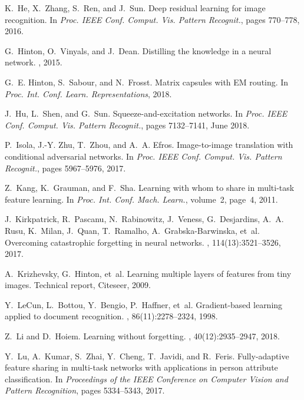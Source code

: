 \documentclass[10pt,twocolumn,letterpaper]{article}
\begin{document}
{\begin{thebibliography}{10}
K.~He, X.~Zhang, S.~Ren, and J.~Sun.
\newblock Deep residual learning for image recognition.
\newblock In {\em Proc. IEEE Conf. Comput. Vis. Pattern Recognit.}, pages
  770--778, 2016.

G.~Hinton, O.~Vinyals, and J.~Dean.
\newblock Distilling the knowledge in a neural network.
, 2015.

G.~E. Hinton, S.~Sabour, and N.~Frosst.
\newblock Matrix capsules with {EM} routing.
\newblock In {\em Proc. Int. Conf. Learn. Representations}, 2018.

J.~Hu, L.~Shen, and G.~Sun.
\newblock Squeeze-and-excitation networks.
\newblock In {\em Proc. IEEE Conf. Comput. Vis. Pattern Recognit.}, pages
  7132--7141, June 2018.

P.~Isola, J.-Y. Zhu, T.~Zhou, and A.~A. Efros.
\newblock Image-to-image translation with conditional adversarial networks.
\newblock In {\em Proc. IEEE Conf. Comput. Vis. Pattern Recognit.}, pages
  5967--5976, 2017.

Z.~Kang, K.~Grauman, and F.~Sha.
\newblock Learning with whom to share in multi-task feature learning.
\newblock In {\em Proc. Int. Conf. Mach. Learn.}, volume~2, page~4, 2011.

J.~Kirkpatrick, R.~Pascanu, N.~Rabinowitz, J.~Veness, G.~Desjardins, A.~A.
  Rusu, K.~Milan, J.~Quan, T.~Ramalho, A.~Grabska-Barwinska, et~al.
\newblock Overcoming catastrophic forgetting in neural networks.
, 114(13):3521--3526, 2017.

A.~Krizhevsky, G.~Hinton, et~al.
\newblock Learning multiple layers of features from tiny images.
\newblock Technical report, Citeseer, 2009.

Y.~LeCun, L.~Bottou, Y.~Bengio, P.~Haffner, et~al.
\newblock Gradient-based learning applied to document recognition.
, 86(11):2278--2324, 1998.

Z.~Li and D.~Hoiem.
\newblock Learning without forgetting.
, 40(12):2935--2947,
  2018.

Y.~Lu, A.~Kumar, S.~Zhai, Y.~Cheng, T.~Javidi, and R.~Feris.
\newblock Fully-adaptive feature sharing in multi-task networks with
  applications in person attribute classification.
\newblock In {\em Proceedings of the IEEE Conference on Computer Vision and
  Pattern Recognition}, pages 5334--5343, 2017.


\end{thebibliography}}
\end{document}
